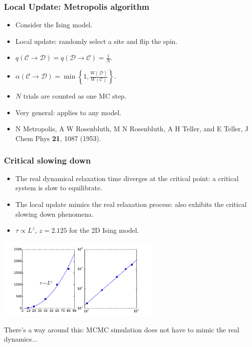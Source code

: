 \documentclass[xcolor=table, 10pt, aspectratio=169]{beamer}
\begin{document}
\begin{frame}
  \frametitle{Local Update: Metropolis algorithm}
  \begin{center}
  \end{center}
  \begin{itemize}
    \item Consider the Ising model.
    \item Local update: randomly select a site and flip the spin.
    \item $q(\mathcal C\rightarrow\mathcal D) = q(\mathcal D\rightarrow\mathcal C) = \frac1N$.
    \item $\alpha(\mathcal C\rightarrow\mathcal D)=\min\left\{1,\frac{W(\mathcal D)}{W(\mathcal C)}\right\}.$
    \item $N$ trials are counted as one MC step.
    \item Very general: applies to any model.
    \item N Metropolis, A W Rosenbluth, M N Rosenbluth, A H Teller, and E Teller, J Chem Phys \textbf{21}, 1087 (1953).
  \end{itemize}
\end{frame}

\begin{frame}
  \frametitle{Critical slowing down}
  \begin{itemize}
    \item The real dynamical relaxation time diverges at the critical point: a critical system is slow to equilibrate.
    \item The local update mimics the real relaxation process: also exhibits the critical slowing down phenomena.
    \item $\tau\propto L^z$, $z=2.125$ for the 2D Ising model.
  \end{itemize}
  \begin{center}
    \includegraphics[width=8cm]{slowdown}
  \end{center}
  There's a way around this: MCMC simulation does not have to mimic the real dynamics...
\end{frame}
\end{document}
